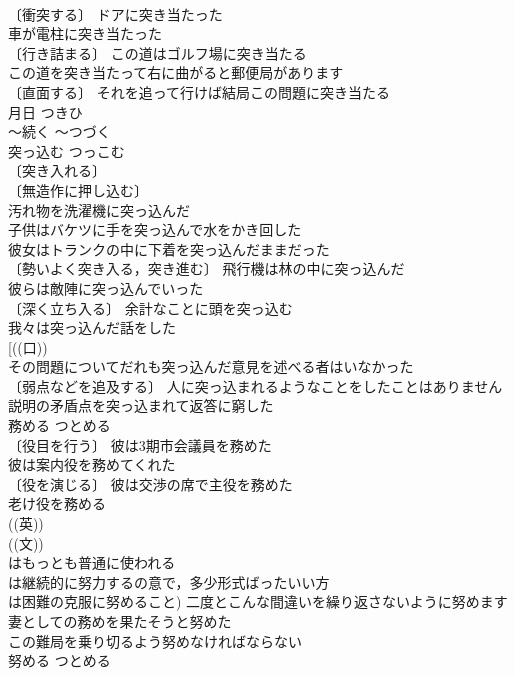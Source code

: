 \documentclass[8pt]{extreport}
\begin{document}
\begin{CJK}{UTF8}{min}
\\	〔衝突する〕 ドアに突き当たった 
\\	車が電柱に突き当たった 
\\	〔行き詰まる〕 この道はゴルフ場に突き当たる 
\\	この道を突き当たって右に曲がると郵便局があります 
\\	〔直面する〕 それを追って行けば結局この問題に突き当たる 
\\	月日	つきひ	
\\	～続く	～つづく	
\\	突っ込む	つっこむ	
\\	〔突き入れる〕
\\	〔無造作に押し込む〕
\\	汚れ物を洗濯機に突っ込んだ 
\\	子供はバケツに手を突っ込んで水をかき回した 
\\	彼女はトランクの中に下着を突っ込んだままだった 
\\	〔勢いよく突き入る，突き進む〕 飛行機は林の中に突っ込んだ 
\\	彼らは敵陣に突っ込んでいった 
\\	〔深く立ち入る〕 余計なことに頭を突っ込む 
\\	我々は突っ込んだ話をした 
\\	[((口)) 
\\	その問題についてだれも突っ込んだ意見を述べる者はいなかった 
\\	〔弱点などを追及する〕 人に突っ込まれるようなことをしたことはありません 
\\	説明の矛盾点を突っ込まれて返答に窮した 
\\	務める	つとめる	
\\	〔役目を行う〕 彼は3期市会議員を務めた 
\\	彼は案内役を務めてくれた 
\\	〔役を演じる〕 彼は交渉の席で主役を務めた 
\\	老け役を務める 
\\	((英)) 
\\	((文)) 
\\	はもっとも普通に使われる
\\	は継続的に努力するの意で，多少形式ばったいい方
\\	は困難の克服に努めること) 二度とこんな間違いを繰り返さないように努めます 
\\	妻としての務めを果たそうと努めた 
\\	この難局を乗り切るよう努めなければならない 
\\	努める	つとめる	

\end{CJK}
\end{document}
